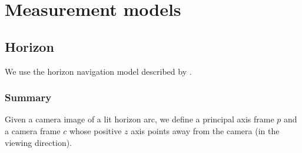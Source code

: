 \documentclass[12pt]{article}
\begin{document}
\section{Measurement models} 

\subsection{Horizon}
We use the horizon navigation model described by \citet{Christian2017}.

\subsubsection{Summary}
Given a camera image of a lit horizon arc, we define a principal axis frame $p$ and a camera frame $c$ whose positive $z$ axis points away from the camera (in the viewing direction).
\end{document}
